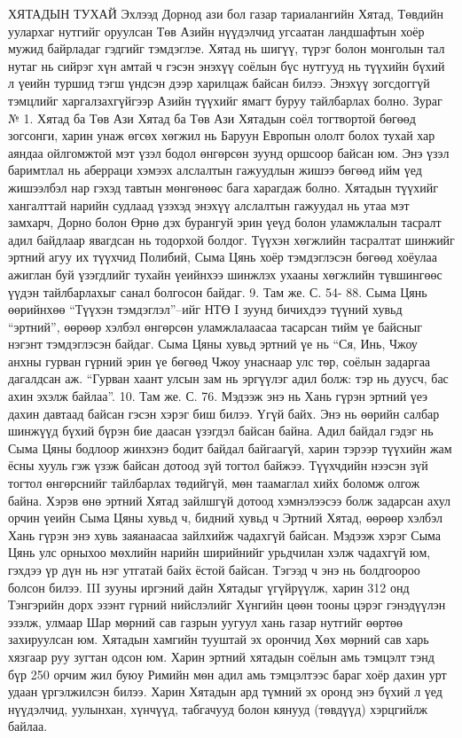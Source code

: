 ХЯТАДЫН ТУХАЙ
Эхлээд Дорнод ази бол газар тариалангийн Хятад, Төвдийн уулархаг нутгийг оруулсан Төв Азийн нүүдэлчид угсаатан ландшафтын хоёр мужид байрладаг гэдгийг тэмдэглэе. Хятад нь шигүү, түрэг болон монголын тал нутаг нь сийрэг хүн амтай ч гэсэн энэхүү соёлын бүс нутгууд нь түүхийн бүхий л үеийн туршид тэгш үндсэн дээр харилцаж байсан билээ. Энэхүү зогсдоггүй тэмцлийг харгалзахгүйгээр Азийн түүхийг ямагт буруу тайлбарлах болно.
Зураг № 1. Хятад ба Төв Ази
Хятад ба Төв Ази
Хятадын соёл тогтвортой бөгөөд зогсонги, харин унаж өгсөх хөгжил нь Баруун Европын ололт болох тухай хар аяндаа ойлгомжтой мэт үзэл бодол өнгөрсөн зуунд оршсоор байсан юм. Энэ үзэл баримтлал нь аберраци хэмээх алслалтын гажуудлын жишээ бөгөөд ийм үед жишээлбэл нар гэхэд тавтын мөнгөнөөс бага харагдаж болно. Хятадын түүхийг хангалттай нарийн судлаад үзэхэд энэхүү алслалтын гажуудал нь утаа мэт замхарч, Дорно болон Өрнө дэх бурангуй эрин үеүд болон уламжлалын тасралт адил байдлаар явагдсан нь тодорхой болдог. Түүхэн хөгжлийн тасралтат шинжийг эртний агуу их түүхчид Полибий, Сыма Цянь хоёр тэмдэглэсэн бөгөөд хоёулаа ажиглан буй үзэгдлийг тухайн үеийнхээ шинжлэх ухааны хөгжлийн түвшингөөс үүдэн тайлбарлахыг санал болгосон байдаг. 9. Там же. С. 54- 88.
Сыма Цянь өөрийнхөө “Түүхэн тэмдэглэл”–ийг НТӨ I зуунд бичихдээ түүний хувьд “эртний”, өөрөөр хэлбэл өнгөрсөн уламжлалаасаа тасарсан тийм үе байсныг нэгэнт тэмдэглэсэн байдаг. Сыма Цяны хувьд эртний үе нь “Ся, Инь, Чжоу анхны гурван гүрний эрин үе бөгөөд Чжоу унаснаар улс төр, соёлын задаргаа дагалдсан аж. “Гурван хаант улсын зам нь эргүүлэг адил болж: тэр нь дуусч, бас ахин эхэлж байлаа”. 10. Там же. С. 76.
Мэдээж энэ нь Хань гүрэн эртний үеэ дахин давтаад байсан гэсэн хэрэг биш билээ. Үгүй байх. Энэ нь өөрийн салбар шинжүүд бүхий бүрэн бие даасан үзэгдэл байсан байна. Адил байдал гэдэг нь Сыма Цяны бодлоор жинхэнэ бодит байдал байгаагүй, харин тэрээр түүхийн жам ёсны хууль гэж үзэж байсан дотоод зүй тогтол байжээ.
Түүхчдийн нээсэн зүй тогтол өнгөрснийг тайлбарлах төдийгүй, мөн таамаглал хийх боломж олгож байна. Хэрэв өнө эртний Хятад зайлшгүй дотоод хэмнэлээсээ болж задарсан ахул орчин үеийн Сыма Цяны хувьд ч, бидний хувьд ч Эртний Хятад, өөрөөр хэлбэл Хань гүрэн энэ хувь заяанаасаа зайлхийж чадахгүй байсан. Мэдээж хэрэг Сыма Цянь улс орныхоо мөхлийн нарийн ширийнийг урьдчилан хэлж чадахгүй юм, гэхдээ үр дүн нь нэг утгатай байх ёстой байсан. Тэгээд ч энэ нь болдгоороо болсон билээ. III зууны иргэний дайн Хятадыг үгүйрүүлж, харин 312 онд Тэнгэрийн дорх эзэнт гүрний нийслэлийг Хүнгийн цөөн тооны цэрэг гэнэдүүлэн эзэлж, улмаар Шар мөрний сав газрын уугуул хань газар нутгийг өөртөө захируулсан юм. Хятадын хамгийн тууштай эх орончид Хөх мөрний сав харь хязгаар руу зугтан одсон юм. Харин эртний хятадын соёлын амь тэмцэлт тэнд бүр 250 орчим жил буюу Римийн мөн адил амь тэмцэлтээс бараг хоёр дахин урт удаан үргэлжилсэн билээ. Харин Хятадын ард түмний эх оронд энэ бүхий л үед нүүдэлчид, уулынхан, хүнчүүд, табгачууд болон кянууд (төвдүүд) хэрцгийлж байлаа.
